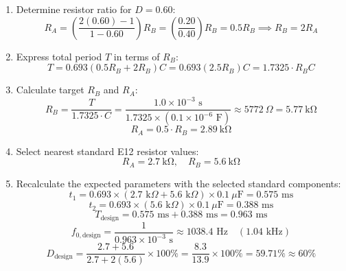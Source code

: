 \begin{enumerate}
	\item Determine resistor ratio for $D = 0.60$:
	\begin{equation}
		R_A = \left( \frac{2(0.60) - 1}{1 - 0.60} \right) R_B = \left( \frac{0.20}{0.40} \right) R_B = 0.5 R_B \implies R_B = 2 R_A
	\end{equation}
	
	\item Express total period $T$ in terms of $R_B$:
	\begin{equation}
		T = 0.693 (0.5 R_B + 2 R_B) C = 0.693 (2.5 R_B) C = 1.7325 \cdot R_B C
	\end{equation}
	
	\item Calculate target $R_B$ and $R_A$:
	\begin{equation}
		R_B = \frac{T}{1.7325 \cdot C} = \frac{1.0 \times 10^{-3}\text{ s}}{1.7325 \times (0.1 \times 10^{-6}\text{ F})} \approx 5772\ \Omega = \SI{5.77}{\kilo\ohm}
	\end{equation}
	\begin{equation}
		R_A = 0.5 \cdot R_B = \SI{2.89}{\kilo\ohm}
	\end{equation}
	
	\item Select nearest standard E12 resistor values:
	\begin{equation}
		R_A = \SI{2.7}{\kilo\ohm}, \quad R_B = \SI{5.6}{\kilo\ohm}
	\end{equation}
	
	\item Recalculate the expected parameters with the selected standard components:
	\begin{equation}
		t_1 = 0.693 \times (2.7\text{ k}\Omega + 5.6\text{ k}\Omega) \times 0.1\ \mu\text{F} = 0.575\text{ ms}
	\end{equation}
	\begin{equation}
		t_2 = 0.693 \times (5.6\text{ k}\Omega) \times 0.1\ \mu\text{F} = 0.388\text{ ms}
	\end{equation}
	\begin{equation}
		T_{\text{design}} = 0.575\text{ ms} + 0.388\text{ ms} = 0.963\text{ ms}
	\end{equation}
	\begin{equation}
		f_{0,\text{design}} = \frac{1}{0.963 \times 10^{-3}\text{ s}} \approx 1038.4\text{ Hz} \quad (1.04\text{ kHz})
	\end{equation}
	\begin{equation}
		D_{\text{design}} = \frac{2.7 + 5.6}{2.7 + 2(5.6)} \times 100\% = \frac{8.3}{13.9} \times 100\% = 59.71\% \approx 60\%
	\end{equation}
\end{enumerate}

